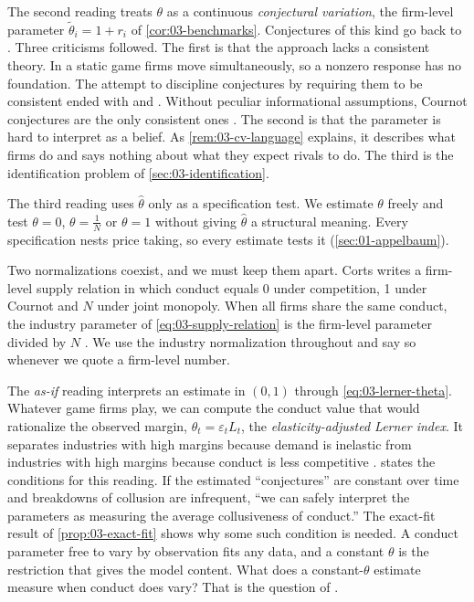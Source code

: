 The second reading treats $\theta$ as a continuous \emph{conjectural variation}, the firm-level parameter
$\tilde\theta_i = 1 + r_i$ of \cref{cor:03-benchmarks}. Conjectures of this kind go back to \citet{Bowley1924}. Three
criticisms followed. The first is that the approach lacks a consistent theory. In a static game firms move
simultaneously, so a nonzero response has no foundation. The attempt to discipline conjectures by requiring them to be
consistent ended with \citet{Daughety1985} and \citet{Lindh1992}. Without peculiar informational assumptions, Cournot
conjectures are the only consistent ones \citep[p.~230]{Corts1999}. The second is that the
parameter is hard to interpret as a belief. As \cref{rem:03-cv-language} explains, it describes what firms do and says
nothing about what they expect rivals to do. The third is the identification problem of \cref{sec:03-identification}.

The third reading uses $\hat\theta$ only as a specification test. We estimate $\theta$ freely and test $\theta = 0$,
$\theta = \frac{1}{N}$ or $\theta = 1$ without giving $\hat\theta$ a structural meaning. Every specification nests price
taking, so every estimate tests it (\cref{sec:01-appelbaum}).

Two normalizations coexist, and we must keep them apart. Corts writes a firm-level supply relation in which conduct equals
0 under competition, 1 under Cournot and $N$ under joint monopoly. When all firms share the same conduct, the industry
parameter of \eqref{eq:03-supply-relation} is the firm-level parameter divided by $N$ \citep[fn.~1]{Corts1999}. We use the
industry normalization throughout and say so whenever we quote a firm-level number.

The \emph{as-if} reading interprets an estimate in $(0, 1)$ through \eqref{eq:03-lerner-theta}. Whatever game firms play,
we can compute the conduct value that would rationalize the observed margin, $\theta_t = \varepsilon_t L_t$, the
\emph{elasticity-adjusted Lerner index}. It separates industries with high margins because demand is inelastic from
industries with high margins because conduct is less competitive \citep[p.~231]{Corts1999}. \citet[p.~1029]{Bresnahan1989}
states the conditions for this reading. If the estimated ``conjectures'' are constant over time and breakdowns of collusion
are infrequent, ``we can safely interpret the parameters as measuring the average collusiveness of conduct.'' The exact-fit
result of \cref{prop:03-exact-fit} shows why some such condition is needed. A conduct parameter free to vary by observation
fits any data, and a constant $\theta$ is the restriction that gives the model content. What does a constant-$\theta$
estimate measure when conduct does vary? That is the question of \citet{Corts1999}.


